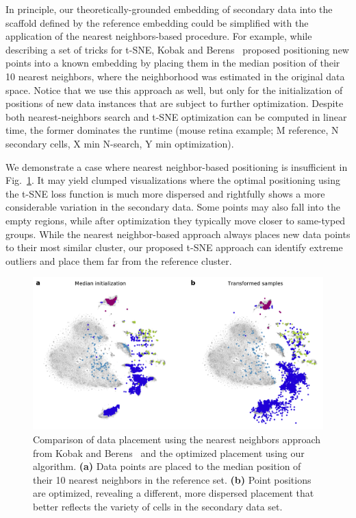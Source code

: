 \documentclass[runningheads]{llncs}
\begin{document}
In principle, our theoretically-grounded embedding of secondary data into the
scaffold defined by the reference embedding could be simplified with the
application of the nearest neighbors-based procedure. For example, while
describing a set of tricks for t-SNE, Kobak and Berens~\cite{art_of_using_tsne}
proposed positioning new points into a known embedding by placing them in the
median position of their 10 nearest neighbors, where the neighborhood was
estimated in the original data space. Notice that we use this approach as well,
but only for the initialization of positions of new data instances that are
subject to further optimization. Despite both nearest-neighbors search and
t-SNE optimization can be computed in linear time, the former dominates the
runtime (mouse retina example; M reference, N secondary cells, X min N-search,
Y min optimization). 

We demonstrate a case where nearest neighbor-based positioning is insufficient
in Fig.~\ref{fig:optimization}. It may yield clumped visualizations where the
optimal positioning using the t-SNE loss function is much more dispersed and
rightfully shows a more considerable variation in the secondary data. 
Some points may also fall into the empty regions, while after optimization they typically
move closer to same-typed groups. While the nearest neighbor-based approach
always places new data points to their most similar cluster, our proposed
t-SNE approach can identify extreme outliers and place them far from the
reference cluster.


\begin{figure}[htbp]
\includegraphics[width=\textwidth]{figures/optimization_retina.pdf}
\caption{Comparison of data placement using the nearest neighbors approach from Kobak
and Berens~\cite{art_of_using_tsne} and the optimized placement using our algorithm.
{\bf (a)} Data points are placed to the median position of their 10 nearest
neighbors in the reference set. {\bf (b)} Point positions are optimized,
revealing a different, more dispersed placement that better reflects the
variety of cells in the secondary data set.}
\label{fig:optimization}
\end{figure}
\end{document}
